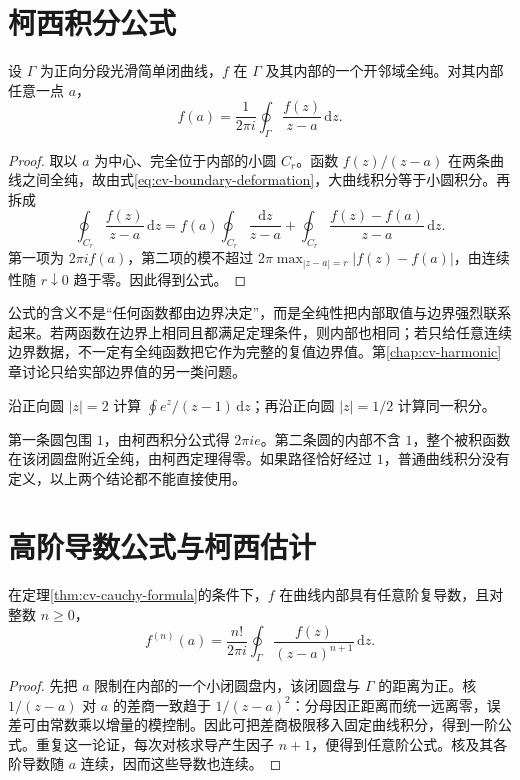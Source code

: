 \documentclass[UTF8,12pt,a4paper,fontset=fandol]{ctexbook}
\begin{document}
\section{柯西积分公式}

\begin{theorem}[柯西积分公式]
\label{thm:cv-cauchy-formula}
设 $\Gamma$ 为正向分段光滑简单闭曲线，$f$ 在 $\Gamma$ 及其内部的一个开邻域全纯。对其内部任意一点 $a$，
\begin{equation}
 f(a)=\frac1{2\pi i}\oint_\Gamma\frac{f(z)}{z-a}\,\mathrm dz.
 \label{eq:cv-cauchy-formula}
\end{equation}
\end{theorem}
\begin{proof}
取以 $a$ 为中心、完全位于内部的小圆 $C_r$。函数 $f(z)/(z-a)$ 在两条曲线之间全纯，故由式\eqref{eq:cv-boundary-deformation}，大曲线积分等于小圆积分。再拆成
\[
 \oint_{C_r}\frac{f(z)}{z-a}\,\mathrm dz
 =f(a)\oint_{C_r}\frac{\mathrm dz}{z-a}
 +\oint_{C_r}\frac{f(z)-f(a)}{z-a}\,\mathrm dz.
\]
第一项为 $2\pi i f(a)$，第二项的模不超过
$2\pi\max_{|z-a|=r}|f(z)-f(a)|$，由连续性随 $r\downarrow0$ 趋于零。因此得到公式。
\end{proof}

公式的含义不是“任何函数都由边界决定”，而是全纯性把内部取值与边界强烈联系起来。若两函数在边界上相同且都满足定理条件，则内部也相同；若只给任意连续边界数据，不一定有全纯函数把它作为完整的复值边界值。第\ref{chap:cv-harmonic}章讨论只给实部边界值的另一类问题。

\begin{example}
沿正向圆 $|z|=2$ 计算 $\oint e^z/(z-1)\,\mathrm dz$；再沿正向圆 $|z|=1/2$ 计算同一积分。
\end{example}
\begin{solve}
第一条圆包围 $1$，由柯西积分公式得 $2\pi i e$。第二条圆的内部不含 $1$，整个被积函数在该闭圆盘附近全纯，由柯西定理得零。如果路径恰好经过 $1$，普通曲线积分没有定义，以上两个结论都不能直接使用。
\end{solve}

\section{高阶导数公式与柯西估计}

\begin{theorem}[高阶导数公式]
\label{thm:cv-higher-cauchy}
在定理\ref{thm:cv-cauchy-formula}的条件下，$f$ 在曲线内部具有任意阶复导数，且对整数 $n\ge0$，
\begin{equation}
 f^{(n)}(a)=\frac{n!}{2\pi i}\oint_\Gamma
 \frac{f(z)}{(z-a)^{n+1}}\,\mathrm dz.
 \label{eq:cv-higher-cauchy}
\end{equation}
\end{theorem}
\begin{proof}
先把 $a$ 限制在内部的一个小闭圆盘内，该闭圆盘与 $\Gamma$ 的距离为正。核 $1/(z-a)$ 对 $a$ 的差商一致趋于 $1/(z-a)^2$：分母因正距离而统一远离零，误差可由常数乘以增量的模控制。因此可把差商极限移入固定曲线积分，得到一阶公式。重复这一论证，每次对核求导产生因子 $n+1$，便得到任意阶公式。核及其各阶导数随 $a$ 连续，因而这些导数也连续。
\end{proof}
\end{document}
